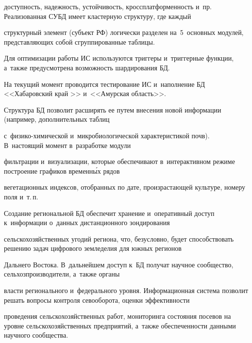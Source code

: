   до\-ступ\-ность, на\-деж\-ность, устой\-чи\-вость, кроссплатформенность и~пр. Реализованная СУБД имеет клас\-тер\-ную структуру, где каж\-дый 

  структурный элемент (субъект РФ) логически разделен на~5~основных модулей, представляющих собой сгруппированные таб\-ли\-цы. 

  Для оптимизации работы ИС используются триггеры и~триггерные функции, а~так\-же предусмот\-ре\-на воз\-мож\-ность шардирования БД. 

  На текущий момент проводится тестирование ИС и~наполнение БД <<Хабаровский край >> и~<<Амурская об\-ласть>>.

  

  Структура БД позволит расширять ее путем внесения новой информации (например, дополнительных таб\-лиц 

  с~фи\-зи\-ко-хи\-ми\-че\-ской и~микробиологической характеристикой почв). В~настоящий момент в~разработке модули 

  фильтрации и~визуализации, которые обеспечивают в~интерактивном режиме по\-стро\-ение графиков временн\'{ы}х рядов 

  вегетационных индексов, отобранных по дате, про\-из\-рас\-та\-ющей культуре, номеру поля и~т.\,п. 

  

  Создание региональной БД обеспечит хранение и~оперативный доступ к~информации о~данных дистанционного зондирования 

  сельскохозяйственных угодий региона, что, безуслов\-но, будет способствовать решению задач циф\-ро\-во\-го земледелия для южных регионов 

  Дальнего Востока. В~дальнейшем доступ к~БД получат научное сообщество, сельхозпроизводители, а~так\-же органы 

  власти регионального и~федерального уровня. Ин\-фор\-ма\-ци\-он\-ная сис\-те\-ма позволит решать вопросы контроля севооборота, оценки эф\-фек\-тив\-ности 

  проведения сельскохозяйственных работ, мониторинга со\-сто\-яния посевов на уровне сельскохозяйственных предприятий, а~также обес\-пе\-чен\-ности данными научного сообщества.

     

